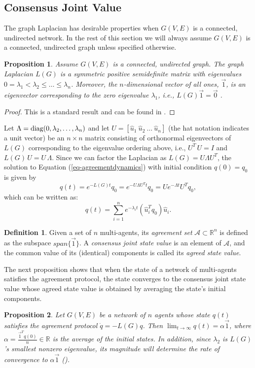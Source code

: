 \documentclass{aims}
\newtheorem{proposition}{Proposition}
\theoremstyle{definition}
\newtheorem{definition}[theorem]{Definition}
\begin{document}
\subsection{Consensus Joint Value}
The graph Laplacian has desirable properties when
$G(V,E)$ is a connected, undirected network. In the rest of this section we will always assume $G(V,E)$ is a connected, undirected graph unless specified otherwise.
\begin{proposition}
Assume $G(V,E)$ is a connected, undirected graph.
The graph Laplacian $L(G)$ is a symmetric positive
semidefinite matrix with eigenvalues $0=\lambda_1<\lambda_2\leq\dots\leq\lambda_n$. Moreover, the $n$-dimensional vector of all ones, $\vec 1$,  is an eigenvector corresponding to the zero eigenvalue $\lambda_1$, i.e.,
$L(G)\vec 1=\vec 0$ .
\end{proposition}
\begin{proof}
This is a standard result and can be found in \cite{DecentralizedControl, PathPlanning, Consensus}.
\end{proof}
Let $\Lambda={\rm diag}(0,\lambda_2,\dots,\lambda_n)$ and let $U=[\hat{u}_1\ \hat{u}_2\ \dots \ \hat{u}_n]$ (the hat notation indicates a unit vector) be an $n\times n$ matrix consisting of orthonormal eigenvectors of $L(G)$
corresponding to the eigenvalue ordering above, i.e., $U^T\,U=I$ and $L(G)\,U=U\,\Lambda$. Since we can factor the Laplacian as $L(G)=U\Lambda U^T$, the solution to Equation (\ref{eq-agreementdynamics}) with initial condition $q(0)=q_0$ is given by $$q(t)=e^{-L(G)t}q_0=e^{-U\Lambda U^Tt}q_0=Ue^{-\Lambda t}U^Tq_0,$$ which can be written as:
\begin{equation}
\label{agreementsolution}
    q(t)=\sum_{i=1}^n e^{-\lambda_i t}(\hat{u}^{T}_i q_0)\hat{u}_i.
    \end{equation}
\begin{definition}
Given a set of $n$ multi-agents, its
\emph{agreement set} $\mathcal{A}\subset\mathbb{R}^n$ is defined as the subspace $span\{\vec{1}\}$. A \emph{consensus joint state value} is an element of $\mathcal{A}$, and the common value of its (identical) components is called its \emph{agreed state value}. 
\end{definition}
The next proposition shows that when the state of a network of multi-agents satisfies the agreement protocol, the state converges to the consensus joint state value whose agreed state value is obtained by averaging the state's initial components.
\begin{proposition}
Let $G(V,E)$ be a network of $n$ agents whose state $q(t)$ satisfies the agreement protocol $\dot{q}=-L(G)q$. Then
$\lim_{t\rightarrow\infty} q(t)=\alpha \vec 1$, where
$\alpha=\frac{\vec 1^{T}q(0)}{n}\in\mathbb{R}$ is the average of the initial states. In addition, since $\lambda_2$ is $L(G)$'s smallest nonzero eigenvalue, its magnitude will determine the rate of convergence to $\alpha\vec 1$ 
(\cite{Consensus, DecentralizedControl}). 
\end{proposition}
\end{document}

